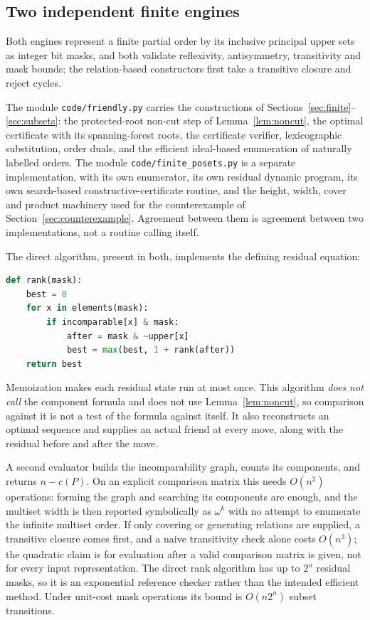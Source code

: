 \documentclass[11pt,letterpaper]{article}
\theoremstyle{definition}
\theoremstyle{remark}
\begin{document}
\subsection{Two independent finite engines}
Both engines represent a finite partial order by its inclusive principal
upper sets as integer bit masks, and both validate reflexivity,
antisymmetry, transitivity and mask bounds; the relation-based constructors
first take a transitive closure and reject cycles.

The module \texttt{code/friendly.py} carries the constructions of
Sections~\ref{sec:finite}--\ref{sec:subsets}: the protected-root non-cut
step of Lemma~\ref{lem:noncut}, the optimal certificate with its
spanning-forest roots, the certificate verifier, lexicographic substitution,
order duals, and the efficient ideal-based enumeration of naturally labelled
orders. The module \texttt{code/finite\_posets.py} is a separate
implementation, with its own enumerator, its own residual dynamic program,
its own search-based constructive-certificate routine, and the
height, width, cover and product machinery used for the counterexample of
Section~\ref{sec:counterexample}. Agreement between them is agreement
between two implementations, not a routine calling itself.

The direct algorithm, present in both, implements the defining residual
equation:
\begin{lstlisting}[language=Python]
def rank(mask):
    best = 0
    for x in elements(mask):
        if incomparable[x] & mask:
            after = mask & ~upper[x]
            best = max(best, 1 + rank(after))
    return best
\end{lstlisting}
Memoization makes each residual state run at most once. This algorithm
\emph{does not call} the component formula and does not use
Lemma~\ref{lem:noncut}, so comparison against it is not a test of the
formula against itself. It also reconstructs an optimal
sequence and supplies an actual friend at every move, along with the
residual before and after the move.

A second evaluator builds the incomparability graph, counts its components,
and returns $n-c(P)$. On an explicit comparison matrix this needs
$O(n^2)$ operations: forming the graph and searching its components are
enough, and the multiset width is then reported symbolically as $\omega^k$
with no attempt to enumerate the infinite multiset order. If only covering
or generating relations are supplied, a transitive closure comes first, and
a naive transitivity check alone costs $O(n^3)$; the quadratic claim is for
evaluation after a valid comparison matrix is given, not for every input
representation. The direct rank algorithm has up to $2^n$ residual masks,
so it is an exponential reference checker rather than the intended efficient
method. Under unit-cost mask operations its bound is $O(n2^n)$ subset
transitions.
\end{document}
